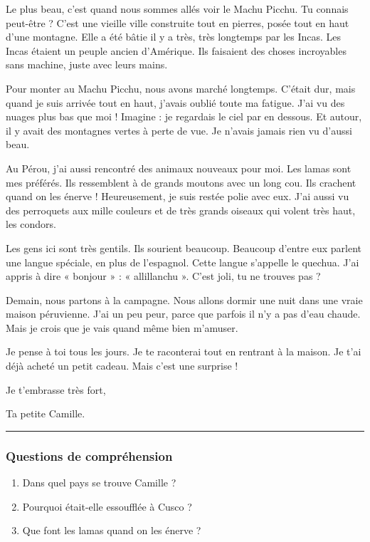 \documentclass[
  french,
  14pt,
  a4paper,
]{extarticle}
\providecommand{\tightlist}{%
  \setlength{\itemsep}{0pt}\setlength{\parskip}{0pt}}
\begin{document}
Le plus beau, c'est quand nous sommes allés voir le Machu Picchu. Tu
connais peut-être ? C'est une vieille ville construite tout en pierres,
posée tout en haut d'une montagne. Elle a été bâtie il y a très, très
longtemps par les Incas. Les Incas étaient un peuple ancien d'Amérique.
Ils faisaient des choses incroyables sans machine, juste avec leurs
mains.

Pour monter au Machu Picchu, nous avons marché longtemps. C'était dur,
mais quand je suis arrivée tout en haut, j'avais oublié toute ma
fatigue. J'ai vu des nuages plus bas que moi ! Imagine : je regardais le
ciel par en dessous. Et autour, il y avait des montagnes vertes à perte
de vue. Je n'avais jamais rien vu d'aussi beau.

Au Pérou, j'ai aussi rencontré des animaux nouveaux pour moi. Les lamas
sont mes préférés. Ils ressemblent à de grands moutons avec un long cou.
Ils crachent quand on les énerve ! Heureusement, je suis restée polie
avec eux. J'ai aussi vu des perroquets aux mille couleurs et de très
grands oiseaux qui volent très haut, les condors.

Les gens ici sont très gentils. Ils sourient beaucoup. Beaucoup d'entre
eux parlent une langue spéciale, en plus de l'espagnol. Cette langue
s'appelle le quechua. J'ai appris à dire « bonjour » : « allillanchu ».
C'est joli, tu ne trouves pas ?

Demain, nous partons à la campagne. Nous allons dormir une nuit dans une
vraie maison péruvienne. J'ai un peu peur, parce que parfois il n'y a
pas d'eau chaude. Mais je crois que je vais quand même bien m'amuser.

Je pense à toi tous les jours. Je te raconterai tout en rentrant à la
maison. Je t'ai déjà acheté un petit cadeau. Mais c'est une surprise !

Je t'embrasse très fort,

Ta petite Camille.

\begin{center}\rule{0.5\linewidth}{0.5pt}\end{center}

\subsubsection{Questions de
compréhension}\label{questions-de-compruxe9hension-15}

\begin{enumerate}
\def\labelenumi{\arabic{enumi}.}
\tightlist
\item
  Dans quel pays se trouve Camille ?
\item
  Pourquoi était-elle essoufflée à Cusco ?
\item
  Que font les lamas quand on les énerve ?
\end{enumerate}
\end{document}
